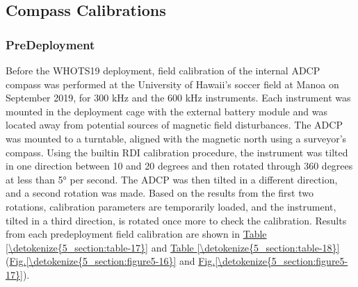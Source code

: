 \documentclass[a4paper,10pt,english,openany,oneside]{sphinxmanual}
\begin{document}
\subsection{Compass Calibrations}
\label{\detokenize{5_section:compass-calibrations}}

\subsubsection{Pre\sphinxhyphen{}Deployment}
\label{\detokenize{5_section:pre-deployment}}
\sphinxAtStartPar
Before the WHOTS\sphinxhyphen{}19 deployment, field calibration of the internal ADCP compass
was performed at the University of Hawaii’s soccer field at Manoa on September
2019, for 300 kHz and the 600 kHz instruments. Each instrument was mounted in
the deployment cage with the external battery module and was located away from
potential sources of magnetic field disturbances. The ADCP was mounted to a
turntable, aligned with the magnetic north using a surveyor’s compass. Using
the built\sphinxhyphen{}in RDI calibration procedure, the instrument was tilted in one
direction between 10 and 20 degrees and then rotated through 360 degrees at
less than 5° per second. The ADCP was then tilted in a different direction, and
a second rotation was made. Based on the results from the first two rotations,
calibration parameters are temporarily loaded, and the instrument, tilted in a
third direction, is rotated once more to check the calibration. Results from
each pre\sphinxhyphen{}deployment field calibration are shown in \hyperref[\detokenize{5_section:table-17}]{Table \ref{\detokenize{5_section:table-17}}} and
\hyperref[\detokenize{5_section:table-18}]{Table \ref{\detokenize{5_section:table-18}}} (\hyperref[\detokenize{5_section:figure5-16}]{Fig.\@ \ref{\detokenize{5_section:figure5-16}}} and \hyperref[\detokenize{5_section:figure5-17}]{Fig.\@ \ref{\detokenize{5_section:figure5-17}}}).
\end{document}
